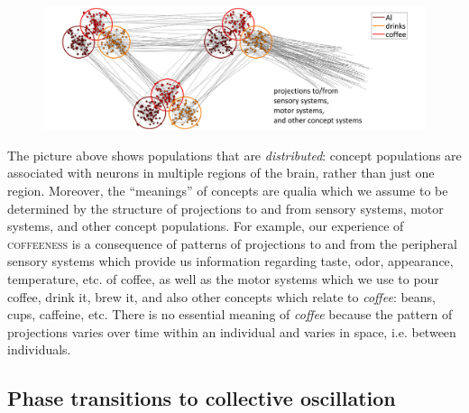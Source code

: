   
\begin{figure}
\includegraphics[width=\textwidth]{figures/Tilsen-img9.png}
\caption{\missingcaption}
\label{fig:2:2}
\end{figure}
 

  The picture above shows populations that are \textit{distributed}: concept populations are associated with neurons in multiple regions of the brain, rather than just one region. Moreover, the “meanings” of concepts are qualia which we assume to be determined by the structure of projections to and from sensory systems, motor systems, and other concept populations. For example, our experience of \textsc{coffeeness} is a consequence of patterns of projections to and from the peripheral sensory systems which provide us information regarding taste, odor, appearance, temperature, etc. of coffee, as well as the motor systems which we use to pour coffee, drink it, brew it, and also other concepts which relate to \textit{coffee}: beans, cups, caffeine, etc. There is no essential meaning of \textit{coffee} because the pattern of projections varies over time within an individual and varies in space, i.e. between individuals.
\subsection{{\textbf{Phase transitions to collective oscillation}}}


